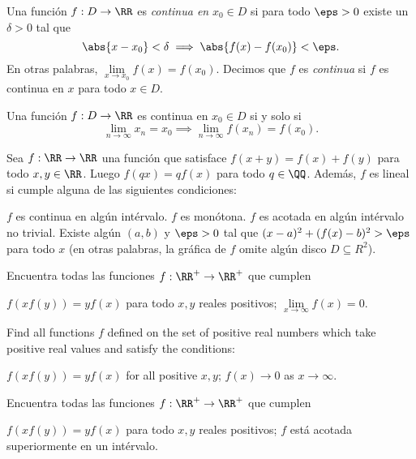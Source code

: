
\begin{definition}[Continuidad]
	Una función $f:D\to\RR$ es \emph{continua en} $x_0\in D$ si para todo $\eps>0$ existe un $\delta>0$ tal que
	\[\abs{x-x_0}<\delta\implies\abs{f(x)-f(x_0)}<\eps.\]
	En otras palabras, $\lim\limits_{x\to x_0}f(x)=f(x_0)$. Decimos que $f$ es \emph{continua} si $f$ es continua en $x$ para todo $x\in D$.
\end{definition}

\begin{proposition}
	Una función $f:D\to\RR$ es continua en $x_0\in D$ si y solo si
	\[\lim_{n\to\infty}x_n=x_0\implies\lim_{n\to\infty}f(x_n)=f(x_0).\]
\end{proposition}

\begin{theorem}
	Sea $f:\RR\to\RR$ una función que satisface $f(x+y)=f(x)+f(y)$ para todo $x,y\in\RR$. Luego $f(qx)=qf(x)$ para todo $q\in\QQ$. Además, $f$ es lineal si cumple alguna de las siguientes condiciones:
	\begin{itemize}
		\ii $f$ es continua en algún intérvalo.
		\ii $f$ es monótona.
		\ii $f$ es acotada en algún intérvalo no trivial.
		\ii Existe algún $(a,b)$ y $\eps>0$ tal que $(x-a)^2+(f(x)-b)^2>\eps$ para todo $x$ (en otras palabras, la gráfica de $f$ omite algún disco $D\subseteq R^2$).
	\end{itemize}
\end{theorem}

\begin{problem}[IMO 1983/1]
	Encuentra todas las funciones $f:\RR^+\to\RR^+$ que cumplen
	\begin{enumerate}[(i)]
		\ii $f(xf(y))=yf(x)$ para todo $x,y$ reales positivos;
		\ii $\lim\limits_{x\to\infty}f(x)=0$.
	\end{enumerate}
	\begin{hint}
		Find all functions $f$ defined on the set of positive real numbers which take positive real values and satisfy the conditions:
		\begin{enumerate}[(i)]
			\ii $f(xf(y))=yf(x)$ for all positive $x,y$;
			\ii $f(x)\to 0$ as $x\to\infty$.
		\end{enumerate}
	\end{hint}
\end{problem}

\begin{problem}
	Encuentra todas las funciones $f:\RR^+\to\RR^+$ que cumplen
	\begin{enumerate}[(i)]
		\ii $f(xf(y))=yf(x)$ para todo $x,y$ reales positivos;
		\ii $f$ está acotada superiormente en un intérvalo.
	\end{enumerate}
\end{problem}

